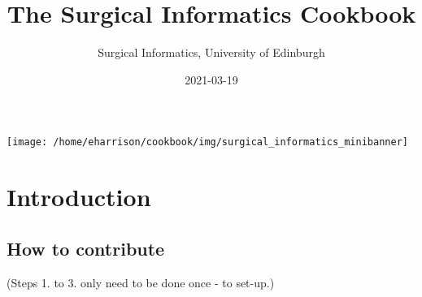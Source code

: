 \documentclass[
]{book}
\title{The Surgical Informatics Cookbook}
\author{Surgical Informatics, University of Edinburgh}
\date{2021-03-19}
\begin{document}
\maketitle

{
\setcounter{tocdepth}{1}
\tableofcontents
}
\hypertarget{section}{%
\chapter*{}\label{section}}

\texttt{[image: /home/eharrison/cookbook/img/surgical\_informatics\_minibanner]}

\hypertarget{introduction}{%
\chapter{Introduction}\label{introduction}}

\hypertarget{how-to-contribute}{%
\section{How to contribute}\label{how-to-contribute}}

(Steps 1. to 3. only need to be done once - to set-up.)
\end{document}
